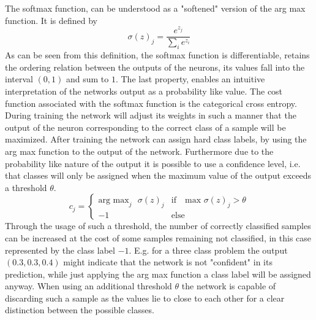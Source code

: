 The softmax function, can be understood as a "softened" version of the arg max function. It is defined by
\begin{equation}
\sigma(z)_j = \frac{e^{z_j}}{\sum_i e^{z_i}}
\end{equation}
As can be seen from this definition, the softmax function is differentiable, retains the ordering relation between the outputs of the neurons, its values fall into the interval $(0,1)$ and sum to $1$. The last property, enables an intuitive interpretation of the networks output as a probability like value. The cost function associated with the softmax function is the categorical cross entropy. During training the network will adjust its weights in such a manner that the output of the neuron corresponding to the correct class of a sample will be maximized. After training the network can assign hard class labels, by using the arg max function to the output of the network. Furthermore due to the probability like nature of the output it is possible to use a confidence level, i.e. that classes will only be assigned when the maximum value of the output exceeds a threshold $\theta$. 
\begin{equation}
c_j = \begin{cases}
\text{arg max}_j\text{ } \sigma(z)_j & \text{if}\quad \text{max } \sigma(z)_j>\theta \\
-1 & \text{else}
\end{cases}
\end{equation}
Through the usage of such a threshold, the number of correctly classified samples can be increased at the cost of some samples remaining not classified, in this case represented by the class label $-1$. E.g. for a three class problem the output $(0.3,0.3,0.4)$ might indicate that the network is not "confident" in its prediction, while just applying the arg max function a class label will be assigned anyway. When using an additional threshold $\theta$ the network is capable of discarding such a sample as the values lie to close to each other for a clear distinction between the possible classes.


